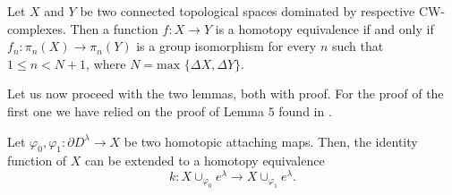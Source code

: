 \begin{theorem}
\label{dominados}
    Let $X$ and $Y$ be two connected topological spaces dominated by respective CW-complexes. Then a function $f:X\to Y$ is a homotopy equivalence if and only if $f_n:\pi_n(X)\to \pi_n(Y)$ is a group isomorphism for every $n$ such that $1\le n<N+1$, where $N=\text{max } \{\Delta X,\Delta Y\}$.
\end{theorem}

\bigskip

Let us now proceed with the two lemmas, both with proof. For the proof of the first one we have relied on the proof of Lemma $5$ found in \cite[p.~67]{whitehead_lemacw}.

\begin{lemma}
\label{lema1_democwvariedad}
    Let $\varphi_0, \varphi_1: \partial D^{\lambda} \to X$ be two homotopic attaching maps. Then, the identity function of $X$ can be extended to a homotopy equivalence
    \begin{equation*}
        k: X\cup_{\varphi_0} e^{\lambda} \to X\cup_{\varphi_1} e^{\lambda}.
    \end{equation*}
\end{lemma}
